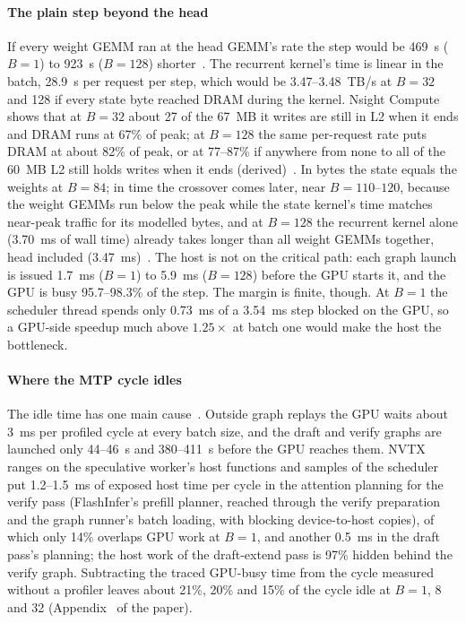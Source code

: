 \paragraph{The plain step beyond the head} If every weight GEMM ran at the head GEMM's rate the step would be 469~\textmu s ($B=1$) to 923~\textmu s ($B=128$) shorter~. The recurrent kernel's time is linear in the batch, 28.9~\textmu s per request per step, which would be 3.47--3.48~TB/s at $B=32$ and 128 if every state byte reached DRAM during the kernel. Nsight Compute shows that at $B=32$ about 27 of the 67~MB it writes are still in L2 when it ends and DRAM runs at 67\% of peak; at $B=128$ the same per-request rate puts DRAM at about 82\% of peak, or at 77--87\% if anywhere from none to all of the 60~MB L2 still holds writes when it ends (derived)~. In bytes the state equals the weights at $B=84$; in time the crossover comes later, near $B=110$--$120$, because the weight GEMMs run below the peak while the state kernel's time matches near-peak traffic for its modelled bytes, and at $B=128$ the recurrent kernel alone (3.70~ms of wall time) already takes longer than all weight GEMMs together, head included (3.47~ms)~. The host is not on the critical path: each graph launch is issued 1.7~ms ($B=1$) to 5.9~ms ($B=128$) before the GPU starts it, and the GPU is busy 95.7--98.3\% of the step. The margin is finite, though. At $B=1$ the scheduler thread spends only 0.73~ms of a 3.54~ms step blocked on the GPU, so a GPU-side speedup much above $1.25\times$ at batch one would make the host the bottleneck.

\paragraph{Where the MTP cycle idles} The idle time has one main cause~. Outside graph replays the GPU waits about 3~ms per profiled cycle at every batch size, and the draft and verify graphs are launched only 44--46~\textmu s and 380--411~\textmu s before the GPU reaches them. NVTX ranges on the speculative worker's host functions and samples of the scheduler put 1.2--1.5~ms of exposed host time per cycle in the attention planning for the verify pass (FlashInfer's prefill planner, reached through the verify preparation and the graph runner's batch loading, with blocking device-to-host copies), of which only 14\% overlaps GPU work at $B=1$, and another 0.5~ms in the draft pass's planning; the host work of the draft-extend pass is 97\% hidden behind the verify graph. Subtracting the traced GPU-busy time from the cycle measured without a profiler leaves about 21\%, 20\% and 15\% of the cycle idle at $B=1$, 8 and 32 (Appendix~ of the paper).

